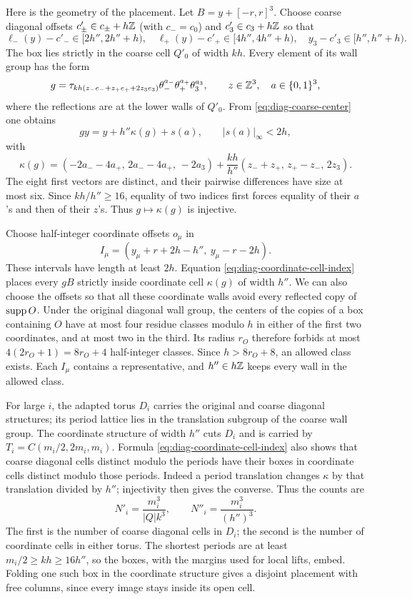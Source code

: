 Here is the geometry of the placement. Let $B=y+[-r,r]^3$. Choose
coarse diagonal offsets $c'_\pm\in c_\pm+h\mathbb Z$ (with
$c_-=c_0$) and $c'_3\in c_3+h\mathbb Z$ so that
\begin{equation}\label{eq:diag-coarse-center}
 \ell_-(y)-c'_-\in[2h'',2h''+h),\quad
 \ell_+(y)-c'_+\in[4h'',4h''+h),\quad
 y_3-c'_3\in[h'',h''+h).
\end{equation}
The box lies strictly in the coarse cell $Q'_0$ of width $kh$.
Every element of its wall group has the form
\[
 g=\tau_{kh(z_-e_-+z_+e_++2z_3e_3)}
            \theta_-^{a_-}\theta_+^{a_+}\theta_3^{a_3},
 \qquad z\in\mathbb Z^3,\quad a\in\{0,1\}^3,
\]
where the reflections are at the lower walls of $Q'_0$. From
\eqref{eq:diag-coarse-center} one obtains
\begin{equation}\label{eq:diag-coordinate-cell-index}
 gy=y+h''\kappa(g)+s(a),\qquad |s(a)|_\infty<2h,
\end{equation}
with
\[
 \kappa(g)=(-2a_--4a_+,\,2a_--4a_+,\,-2a_3)
       +\frac{kh}{h''}(z_-+z_+,\,z_+-z_-,\,2z_3).
\]
The eight first vectors are distinct, and their pairwise
differences have size at most six. Since $kh/h''\ge16$, equality
of two indices first forces equality of their $a$'s and then of
their $z$'s. Thus $g\mapsto\kappa(g)$ is injective.

Choose half-integer coordinate offsets $o_\mu$ in
\[
 I_\mu=(y_\mu+r+2h-h'',\ y_\mu-r-2h).
\]
These intervals have length at least $2h$. Equation
\eqref{eq:diag-coordinate-cell-index} places every $gB$ strictly
inside coordinate cell $\kappa(g)$ of width $h''$. We can also
choose the offsets so that all these coordinate walls avoid
every reflected copy of $\operatorname{supp} O$. Under the original diagonal
wall group, the centers of the copies of a box containing $O$
have at most four residue classes modulo $h$ in either of the
first two coordinates, and at most two in the third. Its radius
$r_O$ therefore forbids at most $4(2r_O+1)=8r_O+4$ half-integer
classes. Since $h>8r_O+8$, an allowed class exists. Each $I_\mu$
contains a representative, and $h''\in h\mathbb Z$ keeps every wall
in the allowed class.

For large $i$, the adapted torus $D_i$ carries the original and
coarse diagonal structures; its period lattice lies in the
translation subgroup of the coarse wall group. The coordinate
structure of width $h''$ cuts $D_i$ and is carried by
$T_i=C(m_i/2,2m_i,m_i)$. Formula
\eqref{eq:diag-coordinate-cell-index} also shows that coarse
diagonal cells distinct modulo the periods have their boxes in
coordinate cells distinct modulo those periods. Indeed a period
translation changes $\kappa$ by that translation divided by
$h''$; injectivity then gives the converse. Thus the counts are
\begin{equation}\label{eq:diag-coarse-cell-counts}
 N'_i=\frac{m_i^3}{|Q|k^3},\qquad
 N''_i=\frac{m_i^3}{(h'')^3}.
\end{equation}
The first is the number of coarse diagonal cells in $D_i$; the
second is the number of coordinate cells in either torus. The
shortest periods are at least $m_i/2\ge kh\ge16h''$, so the
boxes, with the margins used for local lifts, embed. Folding
one such box in the coordinate structure gives a disjoint
placement with free columns, since every image stays inside
its open cell.

